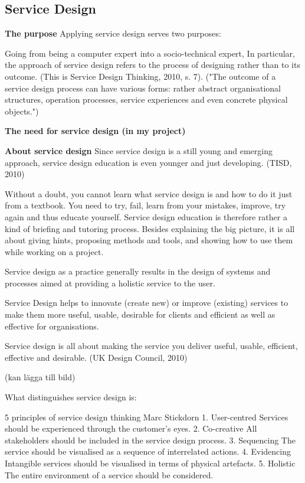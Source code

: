 \subsection{Service Design}

\textbf{The purpose}
Applying service design serves two purposes:

Going from being a computer expert into a socio-technical expert,
In particular, the approach of service design refers to the process of designing rather than to its outcome. (This is Service Design Thinking, 2010, s. 7). ("The outcome of a service design process can have various forms: rather abstract organisational structures, operation processes, service experiences and even concrete physical objects.")

\textbf{The need for service design (in my project)}

\textbf{About service design}
Since service design is a still young and emerging approach, service design education is even younger and just developing. (TISD, 2010)

Without a doubt, you cannot learn what service design is and how to do it just from a textbook. You need to try, fail, learn from your mistakes, improve, try again and thus educate yourself.
Service design education is therefore rather a kind of briefing and tutoring process. Besides explaining the big picture, it is all about giving hints, proposing methods and tools, and showing how to use them while working on a project.

Service design as a practice generally results in the design of systems and processes aimed at providing a holistic service to the user.

Service Design helps to innovate (create new) or improve (existing) services to make them more useful, usable, desirable for clients and efficient as well as effective for organisations.

Service design is all about making the service you deliver useful, usable, efficient, effective and desirable. (UK Design Council, 2010)

(kan lägga till bild)

What distinguishes service design is:

5 principles of service design thinking
Marc Stickdorn
1. User-centred
Services should be experienced through the customer’s eyes. 2. Co-creative
All stakeholders should be included in the service design process.
3. Sequencing
The service should be visualised as a sequence of interrelated actions.
4. Evidencing
Intangible services should be visualised in terms of physical artefacts.
5. Holistic
The entire environment of a service should be considered.

